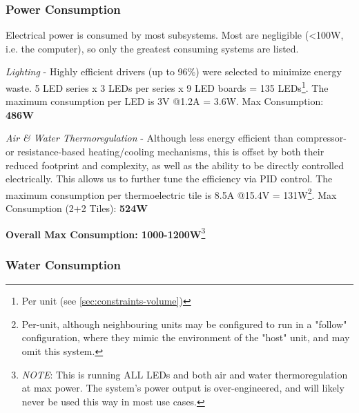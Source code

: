 \documentclass{report}
\begin{document}
\subsubsection{Power Consumption} 
\label{sec:constraints-power}



Electrical power is consumed by most subsystems. Most are negligible (<100W, i.e. the computer), so only the greatest consuming systems are listed.

\textit{Lighting} - Highly efficient drivers (up to 96\%) were selected to minimize energy waste. 5 LED series x 3 LEDs per series x 9 LED boards = 135 LEDs\footnote{Per unit (see \ref{sec:constraints-volume})}. The maximum consumption per LED is 3V @1.2A = 3.6W. Max Consumption: \textbf{486W}\footnotemark[1]

\textit{Air \& Water Thermoregulation} - Although less energy efficient than compressor- or resistance-based heating/cooling mechanisms, this is offset by both their reduced footprint and complexity, as well as the ability to be directly controlled electrically. This allows us to further tune the efficiency via PID control. The maximum consumption per thermoelectric tile is 8.5A @15.4V = 131W\footnote{Per-unit, although neighbouring units may be configured to run in a "follow" configuration, where they mimic the environment of the "host" unit, and may omit this system.}. Max Consumption (2+2 Tiles\footnotemark[1]): \textbf{524W}

\textbf{Overall Max Consumption: 1000-1200W}\footnote{\textit{NOTE}: This is running ALL LEDs and both air and water thermoregulation at max power. The system's power output is over-engineered, and will likely never be used this way in most use cases.}
\newpage


\subsubsection{Water Consumption}
\label{sec:constraints-water}



\end{document}
